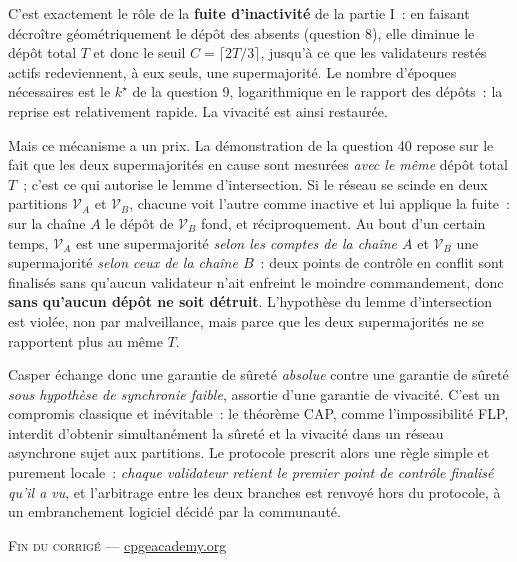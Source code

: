 \documentclass[11pt,a4paper]{article}
\begin{document}
C'est exactement le rôle de la \textbf{fuite d'inactivité} de la partie I~: en faisant
décroître géométriquement le dépôt des absents (question 8), elle diminue le dépôt total $T$
et donc le seuil $C=\lceil 2T/3\rceil$, jusqu'à ce que les validateurs restés actifs
redeviennent, à eux seuls, une supermajorité. Le nombre d'époques nécessaires est le
$k^\star$ de la question 9, logarithmique en le rapport des dépôts~: la reprise est
relativement rapide. La vivacité est ainsi restaurée.

Mais ce mécanisme a un prix. La démonstration de la question 40 repose sur le fait que les
deux supermajorités en cause sont mesurées \emph{avec le même} dépôt total $T$~; c'est ce qui
autorise le lemme d'intersection. Si le réseau se scinde en deux partitions $\mathcal{V}_A$ et
$\mathcal{V}_B$, chacune voit l'autre comme inactive et lui applique la fuite~: sur la chaîne
$A$ le dépôt de $\mathcal{V}_B$ fond, et réciproquement. Au bout d'un certain temps,
$\mathcal{V}_A$ est une supermajorité \emph{selon les comptes de la chaîne $A$} et
$\mathcal{V}_B$ une supermajorité \emph{selon ceux de la chaîne $B$}~: deux points de contrôle
en conflit sont finalisés sans qu'aucun validateur n'ait enfreint le moindre commandement,
donc \textbf{sans qu'aucun dépôt ne soit détruit}. L'hypothèse du lemme d'intersection est
violée, non par malveillance, mais parce que les deux supermajorités ne se rapportent plus au
même $T$.

Casper échange donc une garantie de sûreté \emph{absolue} contre une garantie de sûreté
\emph{sous hypothèse de synchronie faible}, assortie d'une garantie de vivacité. C'est un
compromis classique et inévitable~: le théorème CAP, comme l'impossibilité FLP, interdit
d'obtenir simultanément la sûreté et la vivacité dans un réseau asynchrone sujet aux
partitions. Le protocole prescrit alors une règle simple et purement locale~: \emph{chaque
validateur retient le premier point de contrôle finalisé qu'il a vu}, et l'arbitrage entre les
deux branches est renvoyé hors du protocole, à un embranchement logiciel décidé par la
communauté.

\vfill
\begin{center}\small\textsc{Fin du corrigé} \quad---\quad
\href{https://cpgeacademy.org}{cpgeacademy.org}\end{center}
\end{document}
